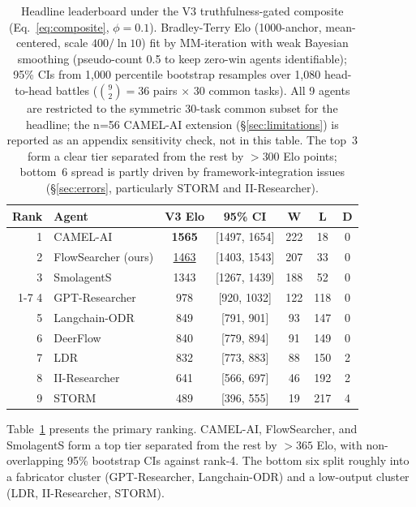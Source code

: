\documentclass{article}
\begin{document}
\begin{table}[t]
\centering
\caption{Headline leaderboard under the V3 truthfulness-gated composite (Eq.~\ref{eq:composite}, $\phi{=}0.1$). Bradley-Terry Elo (1000-anchor, mean-centered, scale $400/\ln 10$) fit by MM-iteration with weak Bayesian smoothing (pseudo-count 0.5 to keep zero-win agents identifiable); 95\% CIs from 1{,}000 percentile bootstrap resamples over 1{,}080 head-to-head battles ($\binom{9}{2}=36$ pairs $\times$ 30 common tasks). All 9 agents are restricted to the symmetric 30-task common subset for the headline; the n=56 CAMEL-AI extension (\S\ref{sec:limitations}) is reported as an appendix sensitivity check, not in this table. The top~3 form a clear tier separated from the rest by ${>}300$ Elo points; bottom~6 spread is partly driven by framework-integration issues (\S\ref{sec:errors}, particularly STORM and II-Researcher).}
\label{tab:leaderboard}
\vspace{1mm}
\small
\begin{tabular}{@{}rlccccc@{}}
\toprule
\textbf{Rank} & \textbf{Agent} & \textbf{V3 Elo} & \textbf{95\% CI} & \textbf{W} & \textbf{L} & \textbf{D} \\
\midrule
1 & CAMEL-AI            & \textbf{1565} & [1497, 1654] & 222 & 18 & 0 \\
2 & FlowSearcher (ours) & \underline{1463} & [1403, 1543] & 207 & 33 & 0 \\
3 & SmolagentS          & 1343 & [1267, 1439] & 188 & 52 & 0 \\
\cmidrule(lr){1-7}
4 & GPT-Researcher      &  978 & [\phantom{0}920, 1032] & 122 & 118 & 0 \\
5 & Langchain-ODR       &  849 & [\phantom{0}791, \phantom{0}901] &  93 & 147 & 0 \\
6 & DeerFlow            &  840 & [\phantom{0}779, \phantom{0}894] &  91 & 149 & 0 \\
7 & LDR                 &  832 & [\phantom{0}773, \phantom{0}883] &  88 & 150 & 2 \\
8 & II-Researcher       &  641 & [\phantom{0}566, \phantom{0}697] &  46 & 192 & 2 \\
9 & STORM               &  489 & [\phantom{0}396, \phantom{0}555] &  19 & 217 & 4 \\
\bottomrule
\end{tabular}
\end{table}

Table~\ref{tab:leaderboard} presents the primary ranking. CAMEL-AI, FlowSearcher, and SmolagentS form a top tier separated from the rest by ${>}365$ Elo, with non-overlapping 95\% bootstrap CIs against rank-4. The bottom six split roughly into a fabricator cluster (GPT-Researcher, Langchain-ODR) and a low-output cluster (LDR, II-Researcher, STORM).
\end{document}
